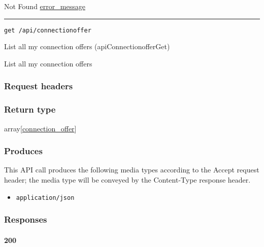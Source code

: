 Not Found \protect\hyperlink{error_message}{error\_message}

\begin{center}\rule{0.5\linewidth}{\linethickness}\end{center}

\protect\hypertarget{apiConnectionofferGet}{}{}

\begin{verbatim}
get /api/connectionoffer
\end{verbatim}

List all my connection offers ({apiConnectionofferGet})

List all my connection offers

\hypertarget{request-headers-27}{%
\subsubsection{Request headers}\label{request-headers-27}}

\hypertarget{return-type-40}{%
\subsubsection{Return type}\label{return-type-40}}

array{[}\protect\hyperlink{connection_offer}{connection\_offer}{]}

\hypertarget{produces-50}{%
\subsubsection{Produces}\label{produces-50}}

This API call produces the following media types according to the
{Accept} request header; the media type will be conveyed by the
{Content-Type} response header.

\begin{itemize}
\tightlist
\item
  \texttt{application/json}
\end{itemize}

\hypertarget{responses-50}{%
\subsubsection{Responses}\label{responses-50}}

\hypertarget{section-164}{%
\paragraph{200}\label{section-164}}

